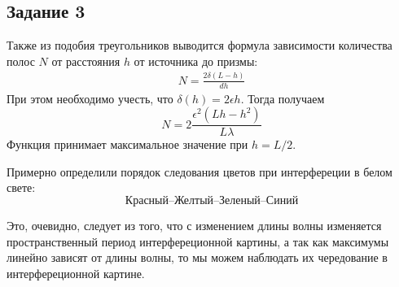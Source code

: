 \subsection{Задание 3}
Также из подобия треугольников выводится формула зависимости количества полос $N$ от расстояния $h$ от источника до призмы:
\begin{gather}
	N=\frac{2\delta(L-h)}{dh} \nonumber
\end{gather}
При этом необходимо учесть, что $\delta(h)=2\epsilon h$. Тогда получаем 
\begin{equation}
	N=2\frac{\epsilon^2(Lh-h^2)}{L\lambda}
\end{equation}
Функция принимает максимальное значение при $h=L/2$.

Примерно определили порядок следования цветов при интерфереции в белом свете:
\begin{equation}
	\text{Красный--Желтый--Зеленый--Синий}
\end{equation}

Это, очевидно, следует из того, что  с изменением длины волны изменяется пространственный период интерфереционной картины, а так как максимумы линейно зависят от длины волны, то мы можем наблюдать их чередование в интерфереционной картине.  

